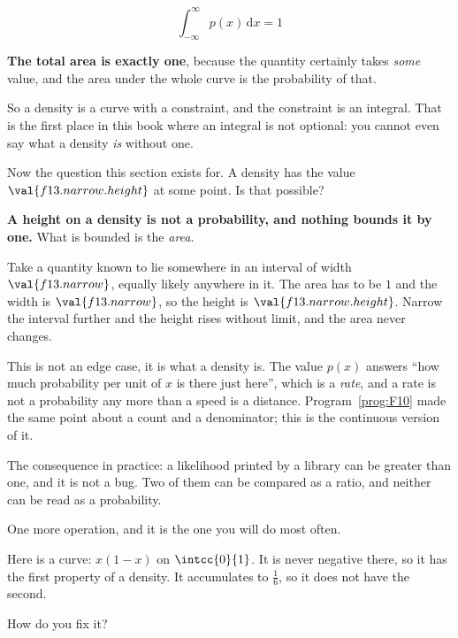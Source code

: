 \begin{fr}
\begin{ansblock}
\[ \int_{-\infty}^{\infty} p(x)\,\mathrm{d}x = 1 \]
\end{ansblock}

\textbf{The total area is exactly one}, because the quantity certainly takes
\emph{some} value, and the area under the whole curve is the probability of
that.

So a density is a curve with a constraint, and the constraint is an integral.
That is the first place in this book where an integral is not optional: you
cannot even say what a density \emph{is} without one.

Now the question this section exists for. A density has the value
$\val{f13.narrow.height}$ at some point. Is that possible?
\dotline
\nextframe
\end{fr}

\begin{fr}
\begin{trapbox}
\textbf{A height on a density is not a probability, and nothing bounds it by
one.} What is bounded is the \emph{area}.

Take a quantity known to lie somewhere in an interval of width
$\val{f13.narrow}$, equally likely anywhere in it. The area has to be $1$ and
the width is $\val{f13.narrow}$, so the height is
$\val{f13.narrow.height}$. Narrow the interval further and the height rises
without limit, and the area never changes.

This is not an edge case, it is what a density is. The value $p(x)$ answers
\enquote{how much probability per unit of $x$ is there just here}, which is a
\emph{rate}, and a rate is not a probability any more than a speed is a
distance. Program~\ref{prog:F10} made the same point about a count and a
denominator; this is the continuous version of it.

The consequence in practice: a likelihood printed by a library can be greater
than one, and it is not a bug. Two of them can be compared as a ratio, and
neither can be read as a probability.
\end{trapbox}

\end{fr}

\begin{fr}
One more operation, and it is the one you will do most often.

Here is a curve: $x(1-x)$ on $\intcc{0}{1}$. It is never negative there, so it
has the first property of a density. It accumulates to $\frac{1}{6}$, so it
does not have the second.

How do you fix it?
\nextframe
\end{fr}

